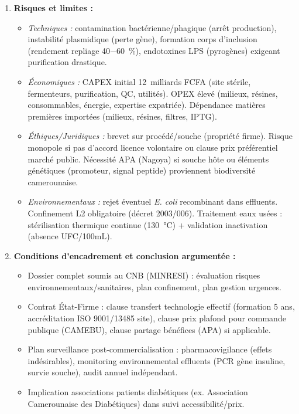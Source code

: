 \documentclass[11pt]{article}
\begin{document}
\begin{exoresolu}
\begin{enumerate}
\begin{itemize}
    \end{itemize}
    \item \textbf{Risques et limites :} 
    \begin{itemize}
        \item \textit{Techniques :} contamination bactérienne/phagique (arrêt production), instabilité plasmidique (perte gène), formation corps d'inclusion (rendement repliage \approx \SI{40-60}{\percent}), endotoxines LPS (pyrogènes) exigeant purification drastique.
        \item \textit{Économiques :} CAPEX initial \approx \SI{12}{milliards} FCFA (site stérile, fermenteurs, purification, QC, utilités). OPEX élevé (milieux, résines, consommables, énergie, expertise expatriée). Dépendance matières premières importées (milieux, résines, filtres, IPTG).
        \item \textit{Éthiques/Juridiques :} brevet sur procédé/souche (propriété firme). Risque monopole si pas d'accord licence volontaire ou clause prix préférentiel marché public. Nécessité APA (Nagoya) si souche hôte ou éléments génétiques (promoteur, signal peptide) proviennent biodiversité camerounaise.
        \item \textit{Environnementaux :} rejet éventuel \emph{E. coli} recombinant dans effluents. Confinement L2 obligatoire (décret 2003/006). Traitement eaux usées : stérilisation thermique continue (\SI{130}{\celsius}) + validation inactivation (absence UFC/100mL).
    \end{itemize}
    \item \textbf{Conditions d'encadrement et conclusion argumentée :} 
    \begin{itemize}
        \item Dossier complet soumis au CNB (MINRESI) : évaluation risques environnementaux/sanitaires, plan confinement, plan gestion urgences.
        \item Contrat État-Firme : clause transfert technologie effectif (formation 5 ans, accréditation ISO 9001/13485 site), clause prix plafond pour commande publique (CAMEBU), clause partage bénéfices (APA) si applicable.
        \item Plan surveillance post-commercialisation : pharmacovigilance (effets indésirables), monitoring environnemental effluents (PCR gène insuline, survie souche), audit annuel indépendant.
        \item Implication associations patients diabétiques (ex. Association Camerounaise des Diabétiques) dans suivi accessibilité/prix.
    \end{itemize}

\end{enumerate}
\end{exoresolu}
\end{document}
